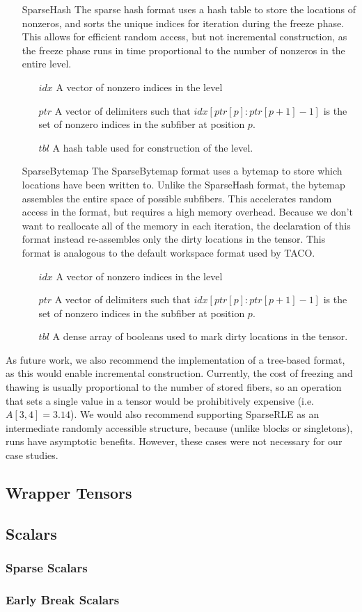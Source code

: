 \begin{enumerate}
\item[SparseHash]
    The sparse hash format uses a hash table to store the locations of nonzeros,
    and sorts the unique indices for iteration during the freeze phase. This
    allows for efficient random access, but not incremental construction, as the
    freeze phase runs in time proportional to the number of nonzeros in the
    entire level.
    \begin{enumerate}
        \item[$idx$] A vector of nonzero indices in the level
        \item[$ptr$] A vector of delimiters such that $idx[ptr[p]:ptr[p+1] - 1]$ is the set of nonzero indices in the subfiber at position $p$.
        \item[$tbl$] A hash table used for construction of the level.
    \end{enumerate}
\item[SparseBytemap]
    The SparseBytemap format uses a bytemap to store which locations have been
    written to. Unlike the SparseHash format, the bytemap assembles the entire
    space of possible subfibers. This accelerates random access in the format,
    but requires a high memory overhead. Because we don't want to reallocate all
    of the memory in each iteration, the declaration of this format instead
    re-assembles only the dirty locations in the tensor. This format is
    analogous to the default workspace format used by TACO.
    \begin{enumerate}
        \item[$idx$] A vector of nonzero indices in the level
        \item[$ptr$] A vector of delimiters such that $idx[ptr[p]:ptr[p+1] - 1]$ is the set of nonzero indices in the subfiber at position $p$.
        \item[$tbl$] A dense array of booleans used to mark dirty locations in the tensor.
    \end{enumerate}
\end{enumerate}

As future work, we also recommend the implementation of a tree-based format, as
this would enable incremental construction. Currently, the cost of freezing and
thawing is usually proportional to the number of stored fibers, so an operation
that sets a single value in a tensor would be prohibitively expensive (i.e.
$A[3, 4] = 3.14$). We would also recommend supporting SparseRLE as an
intermediate randomly accessible structure, because (unlike blocks or
singletons), runs have asymptotic benefits. However, these cases were not
necessary for our case studies.

\subsection{Wrapper Tensors}

\subsection{Scalars}

\subsubsection{Sparse Scalars}
\subsubsection{Early Break Scalars}